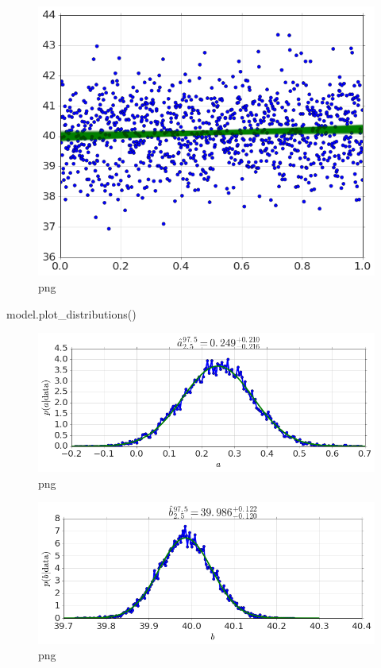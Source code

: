 \documentclass[]{article}
\newenvironment{Shaded}{}{}
\newcommand{\NormalTok}[1]{{#1}}
\begin{document}
\begin{figure}[htbp]
\centering
\includegraphics{output_22_0.png}
\caption{png}
\end{figure}

\begin{Shaded}
\begin{Highlighting}[]
\NormalTok{model.plot_distributions()}
\end{Highlighting}
\end{Shaded}

\begin{figure}[htbp]
\centering
\includegraphics{output_23_0.png}
\caption{png}
\end{figure}

\begin{figure}[htbp]
\centering
\includegraphics{output_23_1.png}
\caption{png}
\end{figure}
\end{document}
